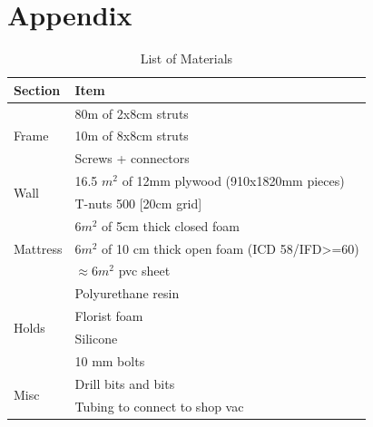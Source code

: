 \documentclass[a4paper, 12pt]{scrreprt}
\begin{document}
\newpage
\section*{Appendix}
\begin{figure}[ht]
\end{figure}


\begin{table}[ht]
\centering
\caption{List of Materials}
\label{material}
\begin{tabular}{l l}
\toprule[2pt]
Section & Item\\
\midrule
\multirow{3}{*}{Frame} & 80m of 2x8cm struts \\
	& 10m of 8x8cm struts \\
	& Screws + connectors \\
\midrule
\multirow{2}{*}{Wall} & 16.5 $m^2$ of 12mm plywood (910x1820mm pieces)\\
	& T-nuts 500 [20cm grid] \\
\midrule
\multirow{3}{*}{Mattress} & 6$m^2$ of 5cm thick closed foam\\
	& 6$m^2$ of 10 cm thick open foam (ICD 58/IFD>=60)\\
	& $\approx$6$m^2$ pvc sheet\\
\midrule
\multirow{4}{*}{Holds} & Polyurethane resin\\
	& Florist foam\\
	& Silicone\\
	& 10 mm bolts\\
	\midrule
\multirow{2}{*}{Misc} &  Drill bits and bits\\
	& Tubing to connect to shop vac\\
\bottomrule[2pt]
\end{tabular}
\end{table}
\end{document}
